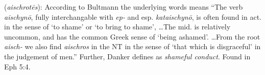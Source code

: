 \item[Shameful,]

(\textit{aischrotēs}):
According to Bultmann the underlying words means ``The verb \emph{aischynō}, fully interchangable with \emph{ep-} and esp. \emph{kataischynō}, is often found in act. in the sense of `to shame' or `to bring to shame', \ldots The mid. is relatively uncommon, and has the common Greek sense of `being ashamed'. \ldots From the root \emph{aisch-} we also find \emph{aischros} in the NT in the sense of `that which is disgraceful' in the judgement of men.'' 
Further, Danker defines  as \emph{shameful conduct}. 
Found in Eph 5:4.
